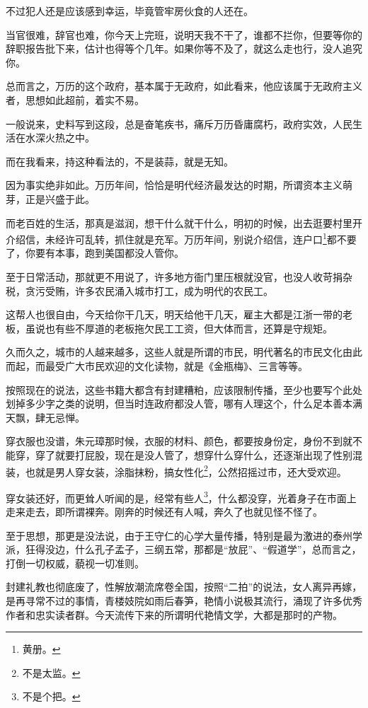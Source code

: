 \begin{multicols}{\theparacolNo}
不过犯人还是应该感到幸运，毕竟管牢房伙食的人还在。

当官很难，辞官也难，你今天上完班，说明天我不干了，谁都不拦你，但要等你的辞职报告批下来，估计也得等个几年。如果你等不及了，就这么走也行，没人追究你。

总而言之，万历的这个政府，基本属于无政府，如此看来，他应该属于无政府主义者，思想如此超前，着实不易。

一般说来，史料写到这段，总是奋笔疾书，痛斥万历昏庸腐朽，政府实效，人民生活在水深火热之中。

而在我看来，持这种看法的，不是装蒜，就是无知。

因为事实绝非如此。万历年间，恰恰是明代经济最发达的时期，所谓资本主义萌芽，正是兴盛于此。

而老百姓的生活，那真是滋润，想干什么就干什么，明初的时候，出去逛要村里开介绍信，未经许可乱转，抓住就是充军。万历年间，别说介绍信，连户口\footnote{黄册。}都不要了，你要有本事，跑到美国都没人管你。

至于日常活动，那就更不用说了，许多地方衙门里压根就没官，也没人收苛捐杂税，贪污受贿，许多农民涌入城市打工，成为明代的农民工。

这帮人也很自由，今天给你干几天，明天给他干几天，雇主大都是江浙一带的老板，虽说也有些不厚道的老板拖欠民工工资，但大体而言，还算是守规矩。

久而久之，城市的人越来越多，这些人就是所谓的市民，明代著名的市民文化由此而起，而最受广大市民欢迎的文化读物，就是《金瓶梅》、三言等等。

按照现在的说法，这些书籍大都含有封建糟粕，应该限制传播，至少也要写个此处划掉多少字之类的说明，但当时连政府都没人管，哪有人理这个，什么足本善本满天飘，肆无忌惮。

穿衣服也没谱，朱元璋那时候，衣服的材料、颜色，都要按身份定，身份不到就不能穿，穿了就要打屁股，现在是没人管了，想穿什么穿什么，还逐渐出现了性别混装，也就是男人穿女装，涂脂抹粉，搞女性化\footnote{不是太监。}，公然招摇过市，还大受欢迎。

穿女装还好，而更耸人听闻的是，经常有些人\footnote{不是个把。}，什么都没穿，光着身子在市面上走来走去，即所谓裸奔。刚奔的时候还有人喊，奔久了也就见怪不怪了。

至于思想，那更是没法说，由于王守仁的心学大量传播，特别是最为激进的泰州学派，狂得没边，什么孔子孟子，三纲五常，那都是“放屁”、“假道学”，总而言之，打倒一切权威，藐视一切准则。

封建礼教也彻底废了，性解放潮流席卷全国，按照“二拍”的说法，女人离异再嫁，是再寻常不过的事情，青楼妓院如雨后春笋，艳情小说极其流行，涌现了许多优秀作者和忠实读者群。今天流传下来的所谓明代艳情文学，大都是那时的产物。


\end{multicols}
